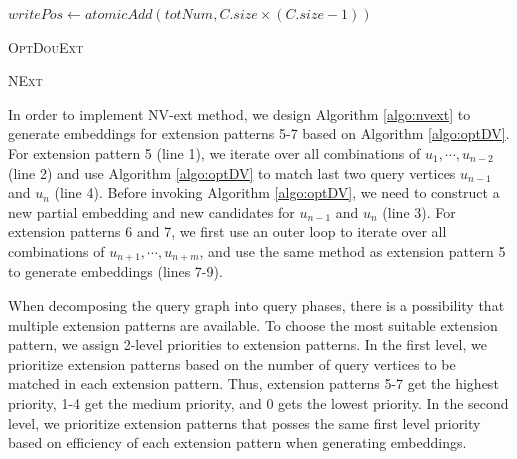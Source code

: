 \begin{algorithm}
	$writePos \leftarrow atomicAdd(totNum,C.size \times (C.size-1))$\;
	\caption{\textsc{OptDouExt}}
	\label{algo:optDV}
\end{algorithm}

\begin{algorithm}
	\caption{\textsc{NExt}}
	\label{algo:nvext}
\end{algorithm}

In order to implement NV-ext method, we design Algorithm \ref{algo:nvext} to generate embeddings for extension patterns 5-7 based on Algorithm \ref{algo:optDV}. For extension pattern 5 (line 1), we iterate over all combinations of $u_1, \cdots, u_{n-2}$ (line 2) and use Algorithm \ref{algo:optDV} to match last two query vertices $u_{n-1}$ and $u_n$ (line 4). Before invoking Algorithm \ref{algo:optDV}, we need to construct a new partial embedding and new candidates for $u_{n-1}$ and $u_n$ (line 3). For extension patterns 6 and 7, we first use an outer loop to iterate over all combinations of $u_{n+1}, \cdots, u_{n+m}$, and use the same method as extension pattern 5 to generate embeddings (lines 7-9).

When decomposing the query graph into query phases, there is a possibility that multiple extension patterns are available. To choose the most suitable extension pattern, we assign 2-level priorities to extension patterns. In the first level, we prioritize extension patterns based on the number of query vertices to be matched in each extension pattern. Thus, extension patterns 5-7 get the highest priority, 1-4 get the medium priority, and 0 gets the lowest priority. In the second level, we prioritize extension patterns that posses the same first level priority based on efficiency of each extension pattern when generating embeddings. 

